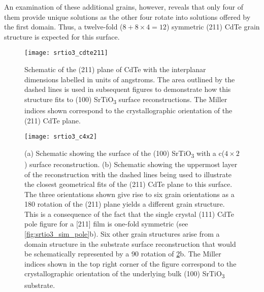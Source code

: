 An examination of these additional grains, however, reveals that only four of them provide unique solutions as the other four rotate into solutions offered by the first domain.
Thus, a twelve-fold (\(8 + 8 \times 4 = 12\)) symmetric (211) CdTe grain structure is expected for this surface.
\begin{figure}
 \centering \texttt{[image: srtio3\_cdte211]}
 \caption[Projection of (211) CdTe unit cell on SrTiO\textsubscript{3} surface]{\label{fig:srtio3_cdte211}Schematic of the (211) plane of CdTe with the interplanar dimensions labelled in units of angstroms.
  The area outlined by the dashed lines is used in subsequent figures to demonstrate how this structure fits to (100) SrTiO\textsubscript{3} surface reconstructions.
  The Miller indices shown correspond to the crystallographic orientation of the (211) CdTe plane.}
\end{figure}
\begin{figure}
 \centering \texttt{[image: srtio3\_c4x2]}
 \caption[CdTe on c(4\(\times\)2) SrTiO\textsubscript{3} surface]{\label{fig:srtio3_c4x2}(a) Schematic showing the surface of the (100) SrTiO\textsubscript{3} with a c(\(4\times2\)) surface reconstruction.
  (b) Schematic showing the uppermost layer of the reconstruction with the dashed lines being used to illustrate the closest geometrical fits of the (211) CdTe plane to this surface.
  The three orientations shown give rise to six grain orientations as a 180\degree{} rotation of the (211) plane yields a different grain structure.
  This is a consequence of the fact that the single crystal (111) CdTe pole figure for a [211] film is one-fold symmetric (see \cref{fig:srtio3_sim_pole}b).
  Six other grain structures arise from a domain structure in the substrate surface reconstruction that would be schematically represented by a 90\degree{} rotation of \cref{fig:srtio3_c4x2}b.
  The Miller indices shown in the top right corner of the figure correspond to the crystallographic orientation of the underlying bulk (100) SrTiO\textsubscript{3} substrate.}
\end{figure}

